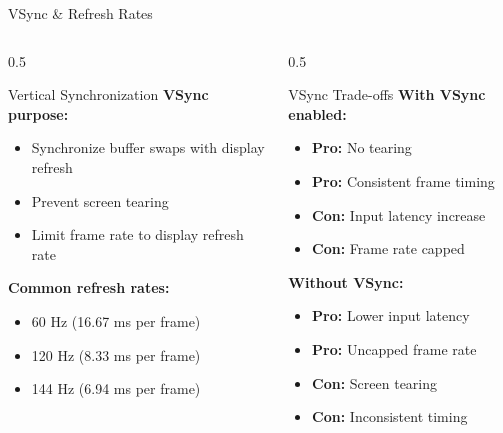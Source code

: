 \begin{frame}{VSync \& Refresh Rates}
  \scriptsize
  \begin{columns}
    \begin{column}{0.5\textwidth}
      \begin{conceptbox}{Vertical Synchronization}
        \textbf{VSync purpose:}
        \begin{itemize}
          \item Synchronize buffer swaps with display refresh
          \item Prevent screen tearing
          \item Limit frame rate to display refresh rate
        \end{itemize}

        \vspace{0.3cm}
        \textbf{Common refresh rates:}
        \begin{itemize}
          \item 60 Hz (16.67 ms per frame)
          \item 120 Hz (8.33 ms per frame)
          \item 144 Hz (6.94 ms per frame)
        \end{itemize}
      \end{conceptbox}
    \end{column}
    \begin{column}{0.5\textwidth}
      \begin{mathbox}{VSync Trade-offs}
        \textbf{With VSync enabled:}
        \begin{itemize}
          \item \textcolor{SecondaryColor}{\textbf{Pro:}} No tearing
          \item \textcolor{SecondaryColor}{\textbf{Pro:}} Consistent frame timing
          \item \textcolor{AccentColor}{\textbf{Con:}} Input latency increase
          \item \textcolor{AccentColor}{\textbf{Con:}} Frame rate capped
        \end{itemize}

        \vspace{0.2cm}
        \textbf{Without VSync:}
        \begin{itemize}
          \item \textcolor{SecondaryColor}{\textbf{Pro:}} Lower input latency
          \item \textcolor{SecondaryColor}{\textbf{Pro:}} Uncapped frame rate
          \item \textcolor{AccentColor}{\textbf{Con:}} Screen tearing
          \item \textcolor{AccentColor}{\textbf{Con:}} Inconsistent timing
        \end{itemize}
      \end{mathbox}
    \end{column}
  \end{columns}


\end{frame}
